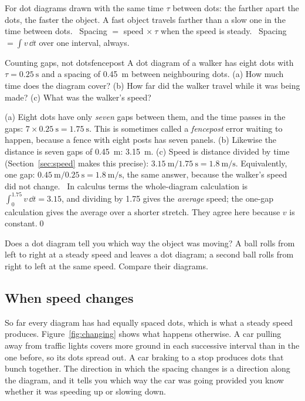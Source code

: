 \begin{keyidea}
For dot diagrams drawn with the same time $\tau$ between dots: the farther apart the dots, the faster the object. A fast object travels farther than a slow one in the time between dots. \elemtag\ Spacing $= $ speed $\times\ \tau$ when the speed is steady. \calctag\ Spacing $= \int v\,\dd t$ over one interval, always.
\end{keyidea}

\begin{example}{Counting gaps, not dots}{fencepost}
A dot diagram of a walker has eight dots with $\tau = \SI{0.25}{\second}$ and a spacing of \SI{0.45}{\metre} between neighbouring dots. (a) How much time does the diagram cover? (b) How far did the walker travel while it was being made? (c) What was the walker's speed?

\solution (a) Eight dots have only \emph{seven} gaps between them, and the time passes in the gaps: $7 \times \SI{0.25}{\second} = \SI{1.75}{\second}$. This is sometimes called a \emph{fencepost} error waiting to happen, because a fence with eight posts has seven panels. (b) Likewise the distance is seven gaps of \SI{0.45}{\metre}: \SI{3.15}{\metre}. (c) Speed is distance divided by time (Section~\ref{sec:speed} makes this precise): $\SI{3.15}{\metre}/\SI{1.75}{\second} = \SI{1.8}{\metre\per\second}$. Equivalently, one gap: $\SI{0.45}{\metre}/\SI{0.25}{\second} = \SI{1.8}{\metre\per\second}$, the same answer, because the walker's speed did not change. \calctag\ In calculus terms the whole-diagram calculation is $\int_0^{1.75} v\,\dd t = 3.15$, and dividing by \num{1.75} gives the \emph{average} speed; the one-gap calculation gives the average over a shorter stretch. They agree here because $v$ is constant.\qed
\end{example}

\begin{checkbox}
Does a dot diagram tell you which way the object was moving? A ball rolls from left to right at a steady speed and leaves a dot diagram; a second ball rolls from right to left at the same speed. Compare their diagrams.
\end{checkbox}

\subsection{When speed changes}

So far every diagram has had equally spaced dots, which is what a steady speed produces. Figure~\ref{fig:changing} shows what happens otherwise. A car pulling away from traffic lights covers more ground in each successive interval than in the one before, so its dots spread out. A car braking to a stop produces dots that bunch together. The direction in which the spacing changes is a direction along the diagram, and it tells you which way the car was going provided you know whether it was speeding up or slowing down.

